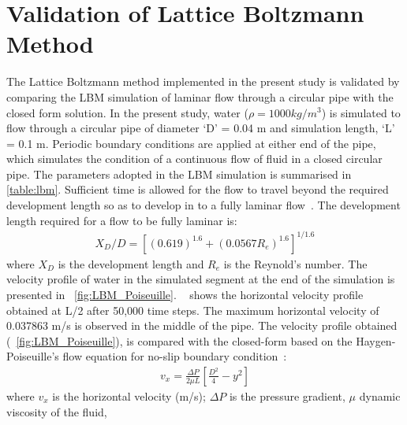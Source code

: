 \section{Validation of Lattice Boltzmann Method}
The Lattice Boltzmann method implemented in the present study is validated by comparing the LBM simulation of laminar flow  through a circular pipe with the closed form solution. In the present study, water ($\rho=1000 kg/m^{3}$) is simulated to flow through a circular pipe of diameter `D' = 0.04 m and simulation length, `L' = 0.1 m. Periodic boundary conditions are applied at either end of the pipe, which simulates the condition of a continuous flow of fluid in a closed circular pipe. The parameters adopted in the LBM simulation is summarised in \cref{table:lbm}. Sufficient time is allowed for the flow to travel beyond the required development length so as to develop in to a fully laminar flow~\citet{Durst2005}. The development length required for a flow to be fully laminar is:
\begin{align}
X_{D}/D=[(0.619)^{1.6}+(0.0567 R_{e})^{1.6}]^{1/1.6}
\end{align}
where $X_{D}$ is the development length and $R_{e}$ is the Reynold's number. The velocity profile of water in the simulated segment at the end of the simulation is presented in ~\cref{fig:LBM_Poiseuille}. ~ shows the horizontal velocity profile obtained at L/2 after 50,000 time steps. The maximum horizontal velocity of 0.037863 m/s is observed in the middle of the pipe. The velocity profile obtained (~\cref{fig:LBM_Poiseuille}), is compared with the closed-form based on the Haygen-Poiseuille's flow equation for no-slip boundary condition~\citep{Willis2008}:
\begin{align}
\mathit{v}_{\mathit{x}}=\frac{\Delta P}{2 \mu L} [\frac{D^{2}}{4}-y^{2}]
\end{align}
where $v_{x}$ is the horizontal velocity (m/s); $\Delta P$ is the pressure gradient, $\mu$ dynamic viscosity of the fluid, 
